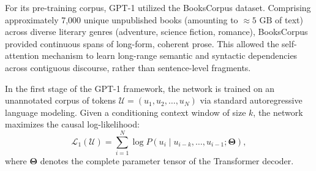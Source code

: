 \documentclass[../../../main.tex]{subfiles}
\begin{document}
For its pre-training corpus, GPT-1 utilized the BooksCorpus dataset. Comprising approximately 7,000 unique unpublished books (amounting to $\approx 5\text{ GB}$ of text) across diverse literary genres (adventure, science fiction, romance), BooksCorpus provided continuous spans of long-form, coherent prose. This allowed the self-attention mechanism to learn long-range semantic and syntactic dependencies across contiguous discourse, rather than sentence-level fragments.

In the first stage of the GPT-1 framework, the network is trained on an unannotated corpus of tokens $\mathcal{U} = (u_1, u_2, \dots, u_N)$ via standard autoregressive language modeling. Given a conditioning context window of size $k$, the network maximizes the causal log-likelihood:
\begin{equation}
\mathcal{L}_1(\mathcal{U}) = \sum_{i=1}^N \log P(u_i \mid u_{i-k}, \dots, u_{i-1}; \boldsymbol{\Theta}),
\label{eq:gpt1_unsupervised_loss}
\end{equation}
where $\boldsymbol{\Theta}$ denotes the complete parameter tensor of the Transformer decoder.
\end{document}
